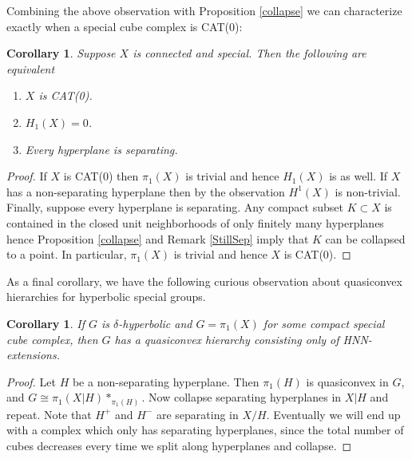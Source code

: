 \documentclass[11pt]{amsart}
\numberwithin{thm}{section}
\newtheorem{corollary}[thm]{Corollary}
\theoremstyle{remark}
\theoremstyle{definition}
\begin{document}
Combining the above observation with Proposition \ref{collapse} we can characterize exactly when a special cube complex is CAT(0):
\begin{corollary} \label{CharCAT}Suppose $X$ is connected and special.  Then the following are equivalent\begin{enumerate}
\item$X$ is CAT(0).
\item $H_1(X)=0$. 
\item Every hyperplane is separating.
\end{enumerate}

\end{corollary}
\begin{proof} If $X$ is CAT(0) then $\pi_1(X)$ is trivial and hence $H_1(X)$ is as well.  If $X$ has a non-separating hyperplane then by the observation $H^1(X)$ is non-trivial. Finally, suppose every hyperplane is separating. Any compact subset $K\subset X$  is contained in the closed unit neighborhoods of only finitely many hyperplanes hence Proposition \ref{collapse} and Remark \ref{StillSep} imply that $K$ can be collapsed to a point.  In particular, $\pi_1(X)$ is trivial and hence $X$ is CAT(0).
\end{proof}
As a final corollary, we have the following curious observation about quasiconvex hierarchies for hyperbolic special groups. 
\begin{corollary} If $G$ is $\delta$-hyperbolic and $G=\pi_1(X)$ for some compact special cube complex, then $G$ has a quasiconvex hierarchy consisting only of HNN-extensions.
\end{corollary}
\begin{proof} Let $H$ be a non-separating hyperplane.  Then $\pi_1(H)$ is quasiconvex in $G$, and $G \cong \pi_1(X|H)*_{\pi_1(H)}$.  Now collapse separating hyperplanes in $X|H$ and repeat.  Note that $H^+$ and $H^-$ are separating in $X/H$. Eventually we will end up with a complex which only has separating hyperplanes, since the total number of cubes decreases every time we split along hyperplanes and collapse.  
\end{proof}
\end{document}
